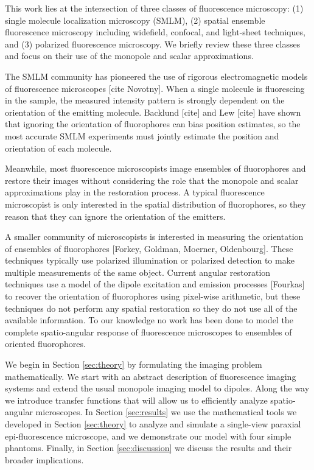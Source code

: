 \documentclass[]{osa-article}
\begin{document}
This work lies at the intersection of three classes of fluorescence microscopy:
(1) single molecule localization microscopy (SMLM), (2) spatial ensemble
fluorescence microscopy including widefield, confocal, and light-sheet
techniques, and (3) polarized fluorescence microscopy. We briefly review these
three classes and focus on their use of the monopole and scalar approximations.

The SMLM community has pioneered the use of rigorous electromagnetic models of
fluorescence microscopes \cite{backer2014, lieb2004} [cite Novotny]. When a
single molecule is fluorescing in the sample, the measured intensity pattern is
strongly dependent on the orientation of the emitting molecule. Backlund [cite]
and Lew [cite] \cite{backlund2014} have shown that ignoring the orientation of
fluorophores can bias position estimates, so the most accurate SMLM experiments
must jointly estimate the position and orientation of each molecule.

Meanwhile, most fluorescence microscopists image ensembles of fluorophores and
restore their images without considering the role that the monopole and scalar
approximations play in the restoration process. A typical fluorescence
microscopist is only interested in the spatial distribution of fluorophores, so
they reason that they can ignore the orientation of the emitters.

A smaller community of microscopists is interested in measuring the orientation
of ensembles of fluorophores \cite{mehta2016} [Forkey, Goldman, Moerner,
Oldenbourg]. These techniques typically use polarized illumination or polarized
detection to make multiple measurements of the same object. Current angular
restoration techniques use a model of the dipole excitation and emission
processes [Fourkas] to recover the orientation of fluorophores using pixel-wise
arithmetic, but these techniques do not perform any spatial restoration so they
do not use all of the available information. To our knowledge no work has been
done to model the complete spatio-angular response of fluorescence microscopes
to ensembles of oriented fluorophores.

We begin in Section \ref{sec:theory} by formulating the imaging problem
mathematically. We start with an abstract description of fluorescence imaging
systems and extend the usual monopole imaging model to dipoles. Along the way we
introduce transfer functions that will allow us to efficiently analyze
spatio-angular microscopes. In Section \ref{sec:results} we use the mathematical
tools we developed in Section \ref{sec:theory} to analyze and simulate a
single-view paraxial epi-fluorescence microscope, and we demonstrate our model
with four simple phantoms. Finally, in Section \ref{sec:discussion} we discuss
the results and their broader implications.
\end{document}

